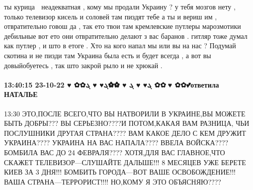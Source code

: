 ты курица 🐔 неадекватная , кому мы продали Украину ? у тебя мозгов нету , только телевизор кисель и соловей там пиздят тебе а ты и вериш им ,
отвратительно говош да , так ето твои там кремлевские путлеры марозмотики дебильные вот ето они отвратительно делают з вас баранов .
гитляр тоже думал как путлер , и што в етоге .
Хто на кого напал мы или вы на нас ?
Подумай скотина и не пизди там
Украина была есть и будет всегда , а вот вы довыйобуетесь , так што закрой рыло и не хрюкай .

\paragraph{13:40:15 23-10-22 ♥ ✿✿ܓ♥ ♥ ܓ ♥ ✿✿ܓ♥ ♥ ܓ ✿✿💋♥ ✿✿💕ответила НАТАЛЬЕ}
13:30
ЭТО,ПОСЛЕ ВСЕГО,ЧТО ВЫ НАТВОРИЛИ В УКРАИНЕ,ВЫ МОЖЕТЕ БЫТЬ ДОБРЫ??? ВЫ
СЕРЬЕЗНО????И ПОТОМ,КАКАЯ ВАМ РАЗНИЦА, ЧЬИ ПОСЛУШНИКИ ДРУГАЯ СТРАНА???? ВАМ
КАКОЕ ДЕЛО С КЕМ ДРУЖИТ УКРАИНА???? УКРАИНА НА ВАС НАПАЛА???? ВВЕЛА ВОЙСКА????
БОМБИЛА ВАС ДО 24 ФЕВРАЛЯ???? ХОТЯ,ДЛЯ ВАС ГЛАВНОЕ,ЧТО СКАЖЕТ
ТЕЛЕВИЗОР---СЛУШАЙТЕ ДАЛЬШЕ!!! 8 МЕСЯЦЕВ УЖЕ БЕРЕТЕ КИЕВ ЗА 3 ДНЯ!!! БОМБИТЬ
ГОРОДА---ВОТ ВАШЕ ОСВОБОЖДЕНИЕ!!! ВАША СТРАНА---ТЕРРОРИСТ!!!! НО,КОМУ Я ЭТО
ОБЪЯСНЯЮ????

